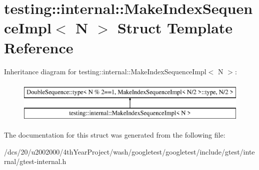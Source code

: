 \hypertarget{structtesting_1_1internal_1_1MakeIndexSequenceImpl}{}\section{testing\+:\+:internal\+:\+:Make\+Index\+Sequence\+Impl$<$ N $>$ Struct Template Reference}
\label{structtesting_1_1internal_1_1MakeIndexSequenceImpl}
Inheritance diagram for testing\+:\+:internal\+:\+:Make\+Index\+Sequence\+Impl$<$ N $>$\+:\begin{figure}[H]
\begin{center}
\leavevmode
\includegraphics[height=2.000000cm]{structtesting_1_1internal_1_1MakeIndexSequenceImpl}
\end{center}
\end{figure}


The documentation for this struct was generated from the following file\+:\begin{DoxyCompactItemize}
\item 
/dcs/20/u2002000/4th\+Year\+Project/wash/googletest/googletest/include/gtest/internal/gtest-\/internal.\+h\end{DoxyCompactItemize}
